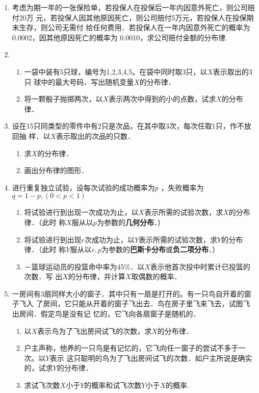 \documentclass[10pt,a4paper]{article}
\begin{document}
\begin{enumerate}

    \item 考虑为期一年的一张保险单，若投保人在投保后一年内因意外死亡，则公司赔付20万
    元，若投保人因其他原因死亡，则公司赔付5万元，若投保人在投保期末生存，则公司无需付
    给任何费用．若投保人在一年内因意外死亡的概率为0.0002，因其他原因死亡的概率为
    0.0010，求公司赔付金额的分布律.


    \item \begin{enumerate}
        \item 一袋中装有5只球，编号为1,2,3,4,5。在袋中同时取3只，以$X$表示取出的3只
        球中的最大号码．写出随机变量$X$的分布律．
        \item 将一颗骰子抛掷两次，以$X$表示两次中得到的小的点数，试求$X$的分布律．
    \end{enumerate}


    \item 设在15只同类型的零件中有2只是次品，在其中取3次，每次任取1只，作不放回抽
    样．以$X$表示取出的次品的只数．
    \begin{enumerate}
        \item 求$X$的分布律．
        \item 画出分布律的图形．
    \end{enumerate}



    \item 进行重复独立试验，设每次试验的成功概率为$p$ ，失败概率为$q=1-p,(0<p<1)$
    \begin{enumerate}
        \item 将试验进行到出现一次成功为止，以$X$表示所需的试验次数，求$X$的分布律．（此时
        称$X$服从以$p$为参数的\textbf{几何分布}．）
        \item 将试验进行到出现$r$次成功为止，以$Y$表示所需的试验次数，求$Y$的分布律．（此时
        称$Y$服从以$r,p$为参数的\textbf{巴斯卡分布}或\textbf{负二项分布}．）
        \item －篮球运动员的投篮命中率为45\%．以$X$表示他首次投中时累计已投篮的次数．写
        出$X$的分布律，并计算$X$取偶数的概率．
    \end{enumerate}


    \item 一房间有3扇同样大小的窗子．其中只有一扇是打开的。有一只鸟自开着的窗子飞入
    了房间，它只能从开着的窗子飞出去．鸟在房子里飞来飞去，试图飞出房间．假定鸟是没有记
    忆的，它飞向各扇窗子是随机的．
    \begin{enumerate}
        \item 以$X$表示鸟为了飞出房间试飞的次数，求$X$的分布律．
        \item 户主声称，他养的一只鸟是有记忆的，它飞向任一窗子的尝试不多于一次。以$Y$表示
        这只聪明的鸟为了飞出房间试飞的次数．如户主所说是确实的，试求$Y$的分布律．
        \item 求试飞次数$X$小于$Y$的概率和试飞次数$Y$小于$X$的概率.
    \end{enumerate}



\end{enumerate}
\end{document}
